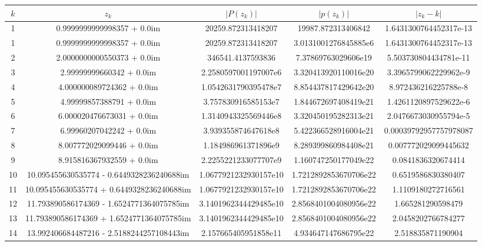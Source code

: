 \documentclass{article}
\begin{document}
\begin{table}[H]
\begin{adjustbox}{center}
\begin{tabular}{|c|c|c|c|c|}
    \hline
    $k$ & $z_k$ & $|P(z_k)|$ & $|p(z_k)|$ & $ |z_k - k|$\\
    \hline
    1 & 0.9999999999998357 + 0.0im & 20259.872313418207 & 19987.872313406842 & 1.6431300764452317e-13\\
    \hline
    1 & 0.9999999999998357 + 0.0im & 20259.872313418207 & 3.0131001276845885e6 & 1.6431300764452317e-13\\
    \hline
    2 & 2.0000000000550373 + 0.0im & 346541.4137593836 & 7.37869763029606e19 & 5.503730804434781e-11\\
    \hline
    3 & 2.99999999660342 + 0.0im & 2.2580597001197007e6 & 3.320413920110016e20 & 3.3965799062229962e-9\\
    \hline
    4 & 4.000000089724362 + 0.0im & 1.0542631790395478e7 & 8.854437817429642e20 & 8.972436216225788e-8\\
    \hline
    5 & 4.99999857388791 + 0.0im & 3.757830916585153e7 & 1.844672697408419e21 & 1.4261120897529622e-6\\
    \hline
    6 & 6.000020476673031 + 0.0im & 1.3140943325569446e8 & 3.320450195282313e21 & 2.0476673030955794e-5\\
    \hline
    7 & 6.99960207042242 + 0.0im & 3.939355874647618e8 & 5.422366528916004e21 & 0.00039792957757978087\\
    \hline
    8 & 8.007772029099446 + 0.0im & 1.184986961371896e9 & 8.289399860984408e21 & 0.007772029099445632\\
    \hline
    9 & 8.915816367932559 + 0.0im & 2.2255221233077707e9 & 1.160747250177049e22 & 0.0841836320674414\\
    \hline
    10 & 10.095455630535774 - 0.6449328236240688im & 1.0677921232930157e10 & 1.7212892853670706e22 & 0.6519586830380407\\
    \hline
    11 & 10.095455630535774 + 0.6449328236240688im & 1.0677921232930157e10 & 1.7212892853670706e22 & 1.1109180272716561\\
    \hline
    12 & 11.793890586174369 - 1.6524771364075785im & 3.1401962344429485e10 & 2.8568401004080956e22 & 1.665281290598479\\
    \hline
    13 & 11.793890586174369 + 1.6524771364075785im & 3.1401962344429485e10 & 2.8568401004080956e22 & 2.0458202766784277\\
    \hline
    14 & 13.992406684487216 - 2.5188244257108443im & 2.157665405951858e11 & 4.934647147686795e22 & 2.518835871190904\\

\end{tabular}
\end{adjustbox}
\end{table}
\end{document}
